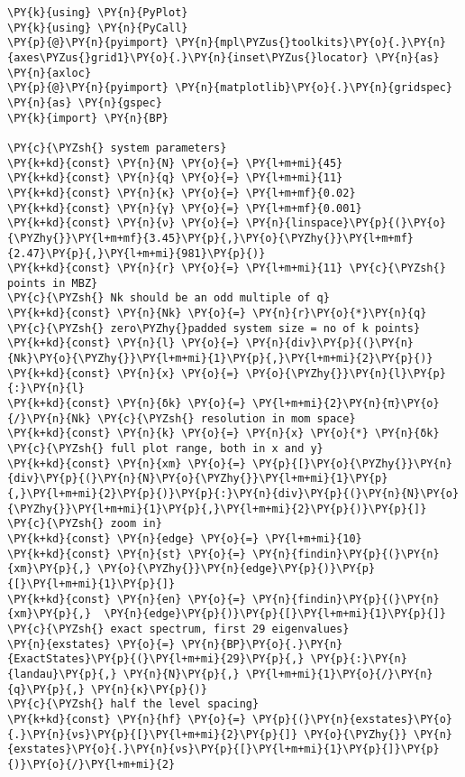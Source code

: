 \begin{Verbatim}[commandchars=\\\{\}]
\PY{k}{using} \PY{n}{PyPlot}
\PY{k}{using} \PY{n}{PyCall}
\PY{p}{@}\PY{n}{pyimport} \PY{n}{mpl\PYZus{}toolkits}\PY{o}{.}\PY{n}{axes\PYZus{}grid1}\PY{o}{.}\PY{n}{inset\PYZus{}locator} \PY{n}{as} \PY{n}{axloc}
\PY{p}{@}\PY{n}{pyimport} \PY{n}{matplotlib}\PY{o}{.}\PY{n}{gridspec} \PY{n}{as} \PY{n}{gspec}
\PY{k}{import} \PY{n}{BP}

\PY{c}{\PYZsh{} system parameters}
\PY{k+kd}{const} \PY{n}{N} \PY{o}{=} \PY{l+m+mi}{45}
\PY{k+kd}{const} \PY{n}{q} \PY{o}{=} \PY{l+m+mi}{11}
\PY{k+kd}{const} \PY{n}{κ} \PY{o}{=} \PY{l+m+mf}{0.02}
\PY{k+kd}{const} \PY{n}{γ} \PY{o}{=} \PY{l+m+mf}{0.001}
\PY{k+kd}{const} \PY{n}{ν} \PY{o}{=} \PY{n}{linspace}\PY{p}{(}\PY{o}{\PYZhy{}}\PY{l+m+mf}{3.45}\PY{p}{,}\PY{o}{\PYZhy{}}\PY{l+m+mf}{2.47}\PY{p}{,}\PY{l+m+mi}{981}\PY{p}{)}
\PY{k+kd}{const} \PY{n}{r} \PY{o}{=} \PY{l+m+mi}{11} \PY{c}{\PYZsh{} points in MBZ}
\PY{c}{\PYZsh{} Nk should be an odd multiple of q}
\PY{k+kd}{const} \PY{n}{Nk} \PY{o}{=} \PY{n}{r}\PY{o}{*}\PY{n}{q} \PY{c}{\PYZsh{} zero\PYZhy{}padded system size = no of k points}
\PY{k+kd}{const} \PY{n}{l} \PY{o}{=} \PY{n}{div}\PY{p}{(}\PY{n}{Nk}\PY{o}{\PYZhy{}}\PY{l+m+mi}{1}\PY{p}{,}\PY{l+m+mi}{2}\PY{p}{)}
\PY{k+kd}{const} \PY{n}{x} \PY{o}{=} \PY{o}{\PYZhy{}}\PY{n}{l}\PY{p}{:}\PY{n}{l}
\PY{k+kd}{const} \PY{n}{δk} \PY{o}{=} \PY{l+m+mi}{2}\PY{n}{π}\PY{o}{/}\PY{n}{Nk} \PY{c}{\PYZsh{} resolution in mom space}
\PY{k+kd}{const} \PY{n}{k} \PY{o}{=} \PY{n}{x} \PY{o}{*} \PY{n}{δk}
\PY{c}{\PYZsh{} full plot range, both in x and y}
\PY{k+kd}{const} \PY{n}{xm} \PY{o}{=} \PY{p}{[}\PY{o}{\PYZhy{}}\PY{n}{div}\PY{p}{(}\PY{n}{N}\PY{o}{\PYZhy{}}\PY{l+m+mi}{1}\PY{p}{,}\PY{l+m+mi}{2}\PY{p}{)}\PY{p}{:}\PY{n}{div}\PY{p}{(}\PY{n}{N}\PY{o}{\PYZhy{}}\PY{l+m+mi}{1}\PY{p}{,}\PY{l+m+mi}{2}\PY{p}{)}\PY{p}{]}
\PY{c}{\PYZsh{} zoom in}
\PY{k+kd}{const} \PY{n}{edge} \PY{o}{=} \PY{l+m+mi}{10}
\PY{k+kd}{const} \PY{n}{st} \PY{o}{=} \PY{n}{findin}\PY{p}{(}\PY{n}{xm}\PY{p}{,} \PY{o}{\PYZhy{}}\PY{n}{edge}\PY{p}{)}\PY{p}{[}\PY{l+m+mi}{1}\PY{p}{]}
\PY{k+kd}{const} \PY{n}{en} \PY{o}{=} \PY{n}{findin}\PY{p}{(}\PY{n}{xm}\PY{p}{,}  \PY{n}{edge}\PY{p}{)}\PY{p}{[}\PY{l+m+mi}{1}\PY{p}{]}
\PY{c}{\PYZsh{} exact spectrum, first 29 eigenvalues}
\PY{n}{exstates} \PY{o}{=} \PY{n}{BP}\PY{o}{.}\PY{n}{ExactStates}\PY{p}{(}\PY{l+m+mi}{29}\PY{p}{,} \PY{p}{:}\PY{n}{landau}\PY{p}{,} \PY{n}{N}\PY{p}{,} \PY{l+m+mi}{1}\PY{o}{/}\PY{n}{q}\PY{p}{,} \PY{n}{κ}\PY{p}{)}
\PY{c}{\PYZsh{} half the level spacing}
\PY{k+kd}{const} \PY{n}{hf} \PY{o}{=} \PY{p}{(}\PY{n}{exstates}\PY{o}{.}\PY{n}{νs}\PY{p}{[}\PY{l+m+mi}{2}\PY{p}{]} \PY{o}{\PYZhy{}} \PY{n}{exstates}\PY{o}{.}\PY{n}{νs}\PY{p}{[}\PY{l+m+mi}{1}\PY{p}{]}\PY{p}{)}\PY{o}{/}\PY{l+m+mi}{2}

\end{Verbatim}
